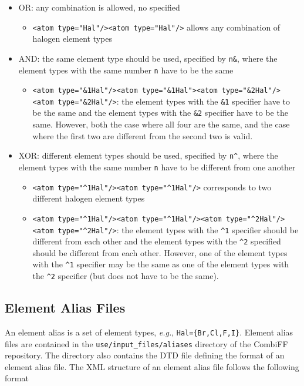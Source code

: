 \documentclass[a4paper,11pt]{article}
\begin{document}
\begin{itemize}
  \item OR: any combination is allowed, no specified
  \begin{itemize}
    \item \texttt{<atom type="Hal"/><atom type="Hal"/>} allows any combination of halogen element types
  \end{itemize}
  \item AND: the same element type should be used, specified by \texttt{n\&}, where the element types with the same number \texttt{n} have to be the same
  \begin{itemize}
    \item \texttt{<atom type="\&{}1Hal"/><atom type="\&{}1Hal"><atom type="\&{}2Hal"/><atom type="\&{}2Hal"/>}: the element types with the \texttt{\&1} specifier have to be the same and the element types with the \texttt{\&2} specifier have to be the same. However, both the case where all four are the same, and the case where the first two are different from the second two is valid.
  \end{itemize}
  \item XOR: different element types should be used, specified by \texttt{n\^}, where the element types with the same number \texttt{n} have to be different from one another
  \begin{itemize}
    \item \texttt{<atom type="\^{}1Hal"/><atom type="\^{}1Hal"/>} corresponds to two different halogen element types
    \item \texttt{<atom type="\^{}1Hal"/><atom type="\^{}1Hal"/><atom type="\^{}2Hal"/><atom type="\^{}2Hal"/>}: the element types with the \texttt{\^{}1} specifier should be different from each other and the element types with the \texttt{\^{}2} specified should be different from each other. However, one of the element types with the \texttt{\^{}1} specifier may be the same as one of the element types with the \texttt{\^{}2} specifier (but does not have to be the same).
  \end{itemize}
\end{itemize}

\subsection{Element Alias Files}\label{sec:alias}

An element alias is a set of element types, \textit{e.g.}, \texttt{Hal=\{Br,Cl,F,I\}}.\cite{Rieder2022} Element alias files are contained in the \texttt{use/input\_files/aliases} directory of the CombiFF repository. The directory also contains the DTD file defining the format of an element alias file. The XML structure of an element alias file follows the following format
\end{document}
